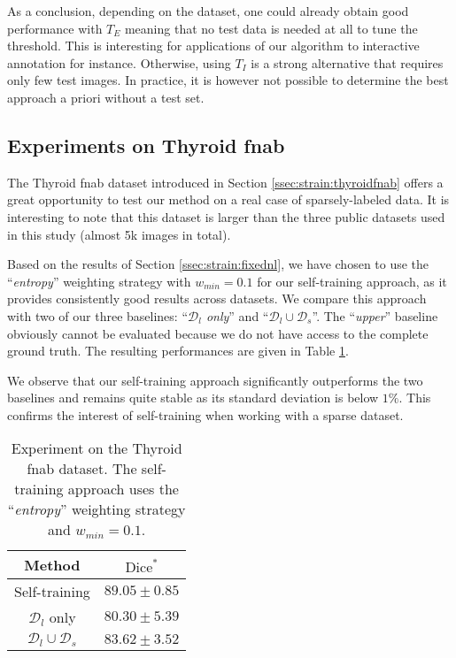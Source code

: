 As a conclusion, depending on the dataset, one could already obtain good performance with $T_E$ meaning that no test data is needed at all to tune the threshold. This is interesting for applications of our algorithm to interactive annotation for instance. Otherwise, using $T_I$ is a strong alternative that requires only few test images. In practice, it is however not possible to determine the best approach a priori without a test set.

\subsection{Experiments on Thyroid \acrshort{fnab}}
\label{ssec:strain:thyroid_exp}

The Thyroid \acrshort{fnab} dataset introduced in Section \ref{ssec:strain:thyroidfnab} offers a great opportunity to test our method on a real case of sparsely-labeled data. It is interesting to note that this dataset is larger than the three public datasets used in this study (almost 5k images in total).

Based on the results of Section \ref{ssec:strain:fixednl}, we have chosen to use the ``\textit{entropy}'' weighting strategy with $w_{min} = 0.1$ for our self-training approach, as it provides consistently good results across datasets. We compare this approach with two of our three baselines: ``\textit{$\mathcal{D}_l$ only}'' and ``$\mathcal{D}_l \cup \mathcal{D}_s$''. The ``\textit{upper}'' baseline obviously cannot be evaluated because we do not have access to the complete ground truth. The resulting performances are given in Table \ref{tab:strain:thyroidresults}.

We observe that our self-training approach significantly outperforms the two baselines and remains quite stable as its standard deviation is below $1\%$. This confirms the interest of self-training when working with a sparse dataset. 

\begin{table}[t]
  \centering 
  \begin{tabular}{|c|c|}
    \hline
    Method & $\text{Dice}^*$ \\
    \hline
    Self-training & $89.05 \pm 0.85$ \\
    $\mathcal{D}_l$ only & $80.30 \pm 5.39$\\  
    $\mathcal{D}_l \cup \mathcal{D}_s$ & $83.62 \pm 3.52$\\
    \hline
  \end{tabular}
  \caption{Experiment on the Thyroid \acrshort{fnab} dataset. The self-training approach uses the ``\textit{entropy}'' weighting strategy and $w_{min} = 0.1$.}
  \label{tab:strain:thyroidresults}
\end{table}

